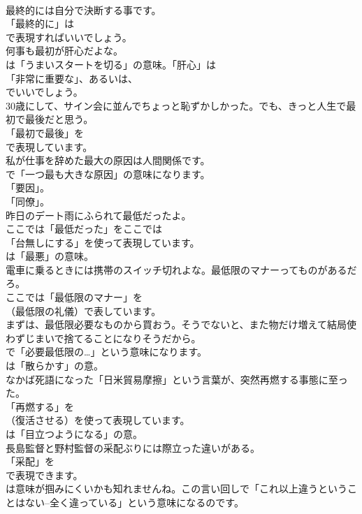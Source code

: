 \documentclass[8pt]{extreport}
\begin{document}
\begin{CJK}{UTF8}{min}
\\	最終的には自分で決断する事です。 
\\	「最終的に」は
\\	で表現すればいいでしょう。	
\\	何事も最初が肝心だよな。 
\\	は「うまいスタートを切る」の意味。「肝心」は
\\	「非常に重要な」、あるいは、
\\	でいいでしょう。	
\\	30歳にして、サイン会に並んでちょっと恥ずかしかった。でも、きっと人生で最初で最後だと思う。 
\\	「最初で最後」を 
\\	で表現しています。	
\\	私が仕事を辞めた最大の原因は人間関係です。 
\\	で「一つ最も大きな原因」の意味になります。
\\	「要因」。
\\	「同僚」。	
\\	昨日のデート雨にふられて最低だったよ。 
\\	ここでは「最低だった」をここでは
\\	「台無しにする」を使って表現しています。
\\	は「最悪」の意味。	
\\	電車に乗るときには携帯のスイッチ切れよな。最低限のマナーってものがあるだろ。 
\\	ここでは「最低限のマナー」を
\\	（最低限の礼儀）で表しています。	
\\	まずは、最低限必要なものから買おう。そうでないと、また物だけ増えて結局使わずじまいで捨てることになりそうだから。 
\\	で「必要最低限の…」という意味になります。
\\	は「散らかす」の意。	
\\	なかば死語になった「日米貿易摩擦」という言葉が、突然再燃する事態に至った。 
\\	「再燃する」を 
\\	（復活させる）を使って表現しています。
\\	は「目立つようになる」の意。	
\\	長島監督と野村監督の采配ぶりには際立った違いがある。 
\\	「采配」を
\\	で表現できます。
\\	は意味が掴みにくいかも知れませんね。この言い回しで「これ以上違うということはない--全く違っている」という意味になるのです。

\end{CJK}
\end{document}
